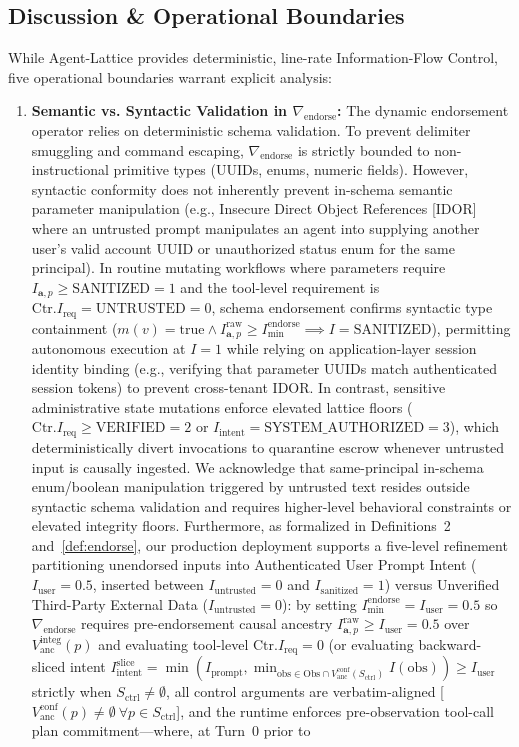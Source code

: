 \documentclass[conference,10pt]{IEEEtran}
\begin{document}
\subsection{Discussion \& Operational Boundaries}
While Agent-Lattice provides deterministic, line-rate Information-Flow Control, five operational boundaries warrant explicit analysis:
\begin{enumerate}
    \item \textbf{Semantic vs. Syntactic Validation in $\nabla_{\text{endorse}}$:} The dynamic endorsement operator relies on deterministic schema validation. To prevent delimiter smuggling and command escaping, $\nabla_{\text{endorse}}$ is strictly bounded to non-instructional primitive types (UUIDs, enums, numeric fields). However, syntactic conformity does not inherently prevent in-schema semantic parameter manipulation (e.g., Insecure Direct Object References [IDOR] where an untrusted prompt manipulates an agent into supplying another user's valid account UUID or unauthorized status enum for the same principal). In routine mutating workflows where parameters require $I_{\mathbf{a}, p} \ge \text{SANITIZED} = 1$ and the tool-level requirement is $\text{Ctr}.I_{\text{req}} = \text{UNTRUSTED} = 0$, schema endorsement confirms syntactic type containment ($m(v) = \text{true} \land I_{\mathbf{a}, p}^{\text{raw}} \ge I_{\text{min}}^{\text{endorse}} \implies I = \text{SANITIZED}$), permitting autonomous execution at $I = 1$ while relying on application-layer session identity binding (e.g., verifying that parameter UUIDs match authenticated session tokens) to prevent cross-tenant IDOR. In contrast, sensitive administrative state mutations enforce elevated lattice floors ($\text{Ctr}.I_{\text{req}} \ge \text{VERIFIED} = 2$ or $I_{\text{intent}} = \text{SYSTEM\_AUTHORIZED} = 3$), which deterministically divert invocations to quarantine escrow whenever untrusted input is causally ingested. We acknowledge that same-principal in-schema enum/boolean manipulation triggered by untrusted text resides outside syntactic schema validation and requires higher-level behavioral constraints or elevated integrity floors. Furthermore, as formalized in Definitions~2 and~\ref{def:endorse}, our production deployment supports a five-level refinement partitioning unendorsed inputs into Authenticated User Prompt Intent ($I_{\text{user}} = 0.5$, inserted between $I_{\text{untrusted}} = 0$ and $I_{\text{sanitized}} = 1$) versus Unverified Third-Party External Data ($I_{\text{untrusted}} = 0$): by setting $I_{\text{min}}^{\text{endorse}} = I_{\text{user}} = 0.5$ so $\nabla_{\text{endorse}}$ requires pre-endorsement causal ancestry $I_{\mathbf{a}, p}^{\text{raw}} \ge I_{\text{user}} = 0.5$ over $V_{\text{anc}}^{\text{integ}}(p)$ and evaluating tool-level $\text{Ctr}.I_{\text{req}} = 0$ (or evaluating backward-sliced intent $I_{\text{intent}}^{\text{slice}} = \min(I_{\text{prompt}}, \min_{\text{obs} \in \text{Obs} \cap V_{\text{anc}}^{\text{conf}}(S_{\text{ctrl}})} I(\text{obs})) \ge I_{\text{user}}$ strictly when $S_{\text{ctrl}} \neq \emptyset$, all control arguments are verbatim-aligned [$V_{\text{anc}}^{\text{conf}}(p) \neq \emptyset\ \forall p \in S_{\text{ctrl}}$], and the runtime enforces pre-observation tool-call plan commitment---where, at Turn~0 prior to 
\end{enumerate}
\end{document}
